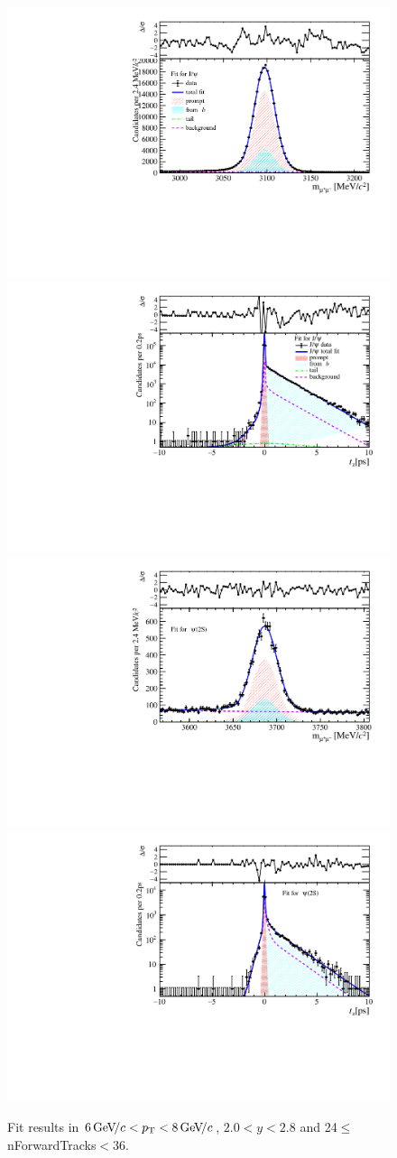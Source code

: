 \begin{figure}[H]
\begin{center}
\includegraphics[width=0.47\linewidth]{pdf/Jpsi/drawmassF/n3y1pt4.pdf}
\includegraphics[width=0.47\linewidth]{pdf/Jpsi/2DFitF/n3y1pt4.pdf}
\vspace*{-0.5cm}
\includegraphics[width=0.47\linewidth]{pdf/Psi2S/drawmassF/n3y1pt4.pdf}
\includegraphics[width=0.47\linewidth]{pdf/Psi2S/2DFitF/n3y1pt4.pdf}
\vspace*{-0.5cm}
\end{center}
\caption{Fit results in $6\text{\,Ge\kern -0.1em V\!/}c<p_{\mathrm{T}}<8\text{\,Ge\kern -0.1em V\!/}c$, $2.0<y<2.8$ and 24$\leq$nForwardTracks$<$36.}
\label{Fitn3y1pt4}
\end{figure}
